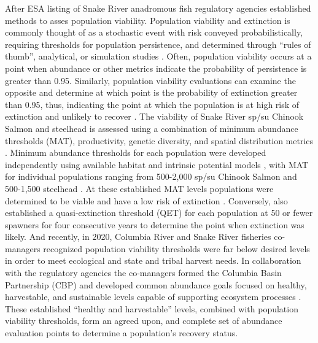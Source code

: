\documentclass[12pt,a4paper]{article}
\begin{document}
After ESA listing of Snake River anadromous fish regulatory agencies established methods to asses population viability. Population viability and extinction is commonly thought of as a stochastic event with risk conveyed probabilistically, requiring thresholds for population persistence, and determined through ``rules of thumb'', analytical, or simulation studies \autocite{thompson_determining_1991}. Often, population viability occurs at a point when abundance or other metrics indicate the probability of persistence is greater than 0.95. Similarly, population viability evaluations can examine the opposite and determine at which point is the probability of extinction greater than 0.95, thus, indicating the point at which the population is at high risk of extinction and unlikely to recover \autocite{thompson_determining_1991}. The viability of Snake River sp/su Chinook Salmon and steelhead is assessed using a combination of minimum abundance thresholds (MAT), productivity, genetic diversity, and spatial distribution metrics \autocite{mcelhany_viable_2000,ictrt_viability_2007}. Minimum abundance thresholds for each population were developed independently using available habitat and intrinsic potential models \autocite{cooney_appendix_2006}, with MAT for individual populations ranging from 500-2,000 sp/su Chinook Salmon and 500-1,500 steelhead \autocite{ictrt_viability_2007}. At these established MAT levels populations were determined to be viable and have a low risk of extinction \autocite{noaa_esa_2017}. Conversely, \textcite{ictrt_viability_2007} also established a quasi-extinction threshold (QET) for each population at 50 or fewer spawners for four consecutive years to determine the point when extinction was likely. And recently, in 2020, Columbia River and Snake River fisheries co-managers recognized population viability thresholds were far below desired levels in order to meet ecological and state and tribal harvest needs. In collaboration with the regulatory agencies the co-managers formed the Columbia Basin Partnership (CBP) and developed common abundance goals focused on healthy, harvestable, and sustainable levels capable of supporting ecosystem processes \autocite{cbp_vision_2020}. These established ``healthy and harvestable'' levels, combined with population viability thresholds, form an agreed upon, and complete set of abundance evaluation points to determine a population's recovery status.
\end{document}
